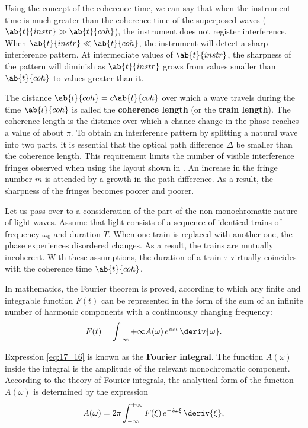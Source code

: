 Using the concept of the coherence time, we can say that when the instrument time is much greater than the coherence time of the superposed waves ($\ab{t}{instr}\gg\ab{t}{coh}$), the instrument does not register interference.
When $\ab{t}{instr}\ll\ab{t}{coh}$, the instrument will detect a sharp interference pattern.
At intermediate values of $\ab{t}{instr}$, the sharpness of the pattern will diminish as $\ab{t}{instr}$ grows from values smaller than
$\ab{t}{coh}$ to values greater than it.

The distance $\ab{l}{coh} = c\ab{t}{coh}$ over which a wave travels during the time $\ab{l}{coh}$ is called the \textbf{coherence length} (or the \textbf{train length}).
The coherence length is the distance over which a chance change in the phase reaches a value of about $\pi$.
To obtain an interference pattern by splitting a natural wave into two parts, it is essential that the optical path difference $\Delta$ be smaller than the coherence length.
This requirement limits the number of visible interference fringes observed when using the layout shown in .
An increase in the fringe number $m$ is attended by a growth in the path difference.
As a result, the sharpness of the fringes becomes poorer and poorer.

Let us pass over to a consideration of the part of the non-monochromatic nature of light waves.
Assume that light consists of a sequence of identical trains of frequency $\omega_0$ and duration $T$.
When one train is replaced with another one, the phase experiences disordered changes.
As a result, the trains are mutually incoherent.
With these assumptions, the duration of a train $\tau$ virtually coincides with the coherence
time $\ab{t}{coh}$.

In mathematics, the Fourier theorem is proved, according to which any finite and integrable function $F(t)$ can be represented in the form of the sum of an infinite number of harmonic components with a continuously changing frequency:
\begin{equation}\label{eq:17_16}
    F(t) = \int_{-\infty}{+\infty} A(\omega) \, e^{i\omega t}\, \deriv{\omega}.
\end{equation}

\noindent
Expression \eqref{eq:17_16} is known as the \textbf{Fourier integral}.
The function $A(\omega)$ inside the integral is the amplitude of the relevant monochromatic component.
According to the theory of Fourier integrals, the analytical form of the function $A(\omega)$ is determined by the expression
\begin{equation}\label{eq:17_17}
    A(\omega) = 2\pi \int_{-\infty}^{+\infty} F(\xi)\, e^{-i\omega \xi}\, \deriv{\xi},
\end{equation}

